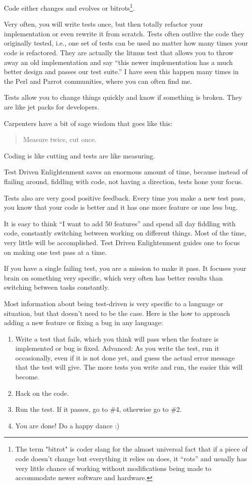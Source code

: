 Code either changes and evolves or bitrots\footnote{The term "bitrot" is coder slang for the almost universal fact that if a piece of code doesn't change but everything it relies on does, it ``rots'' and usually has very little chance of working without modifications being made to accommodate newer software and hardware.}.

Very often, you will write tests once, but then totally refactor your implementation or even rewrite it from scratch. Tests often outlive the code they originally tested, i.e., one set of tests can be used no matter how many times your code is refactored. They are actually the litmus test that allows you to throw away an old implementation and say ``this newer implementation has a much better design and passes our test suite.'' I have seen this happen many times in the Perl and Parrot communities, where you can often find me.

Tests allow you to change things quickly and know if something is broken. They are like jet packs for developers.

Carpenters have a bit of sage wisdom that goes like this:
\begin{quote}Measure twice, cut once.\end{quote} 

Coding is like cutting and tests are like measuring.

Test Driven Enlightenment saves an enormous amount of time, because instead of flailing around, fiddling with code, not having a direction, tests hone your focus.

Tests also are very good positive feedback. Every time you make a new test pass, you know that your code is better and it has one more feature or one less bug.

It is easy to think ``I want to add 50 features'' and spend all day fiddling with code, constantly switching between working on different things. Most of the time, very little will be accomplished. Test Driven Enlightenment guides one to focus on making one test pass at a time.

If you have a single failing test, you are a mission to make it pass. It focuses your brain on something very specific, which very often has better results than switching between tasks constantly.

Most information about being test-driven is very specific to a language or situation, but that doesn't need to be the case. Here is the how to approach adding a new feature or fixing a bug in any language:
\begin{enumerate}
 \item Write a test that fails, which you think will pass when the feature is implemented or bug is fixed. Advanced: As you write the test, run it occasionally, even if it is not done yet, and guess the actual error message that the test will give. The more tests you write and run, the easier this will become.
 \item Hack on the code.
 \item Run the test. If it passes, go to \#4, otherwise go to \#2.
 \item You are done! Do a happy dance :)
\end{enumerate}


